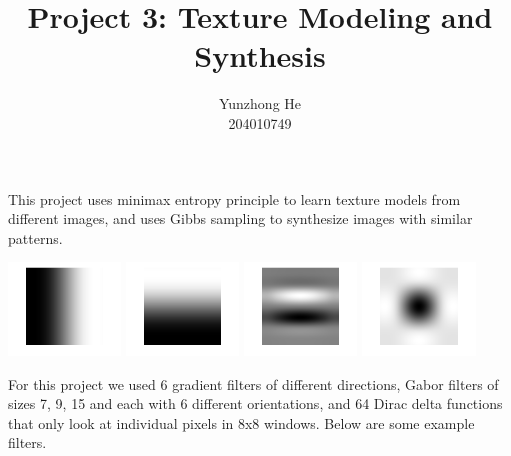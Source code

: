 \documentclass[12pt]{article}
\newenvironment{problem}[2][Part]{\begin{trivlist}
\item[\hskip \labelsep {\bfseries #1}\hskip \labelsep {\bfseries #2}]}{\end{trivlist}}
\begin{document}
 
 
\title{Project 3: Texture Modeling and Synthesis}%
\author{Yunzhong He\\ %
204010749} %
 
\maketitle

\begin{problem}{I Objective}
\item{}
This project uses minimax entropy principle to learn texture models from different images, and uses Gibbs sampling to synthesize images with similar patterns.
\begin{center}
	\includegraphics[width=3cm]{Code/filter_1.png}
	\includegraphics[width=3cm]{Code/filter_2.png}
	\includegraphics[width=3cm]{Code/filter_3.png}
	\includegraphics[width=3cm]{Code/filter_4.png}
\end{center}
\end{problem}

\begin{problem}{II Filters}
\item{}
For this project we used 6 gradient filters of different directions, Gabor filters of sizes 7, 9, 15 and each with 6 different orientations, and 64 Dirac delta functions that only look at individual pixels in 8x8 windows. Below are some example filters.
\end{problem}
\end{document}
